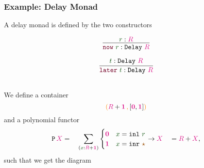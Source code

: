\documentclass[xelatex,mathserif,serif,notheorems]{beamer} %
\theoremstyle{plain} %
\theoremstyle{definition}
\theoremstyle{remark}
\newcommand*{\term}[1]{\textcolor{green!30!black}{#1}} %
\newcommand*{\type}[1]{\textcolor{magenta!90!black}{#1}}
\newcommand*{\containerpair}[2]{\ensuremath{\colorlet{savedleftcolor}{.}\color{orange}\left(\color{savedleftcolor}#1\,\textcolor{orange}{\mathbf{,}}\,#2\color{orange}\right)\color{savedleftcolor}}}
\newcommand*{\unit}{\type{\textbf{1}}}
\newcommand*{\empt}{\type{\textbf{0}}}
\newcommand*{\constant}[1]{\textcolor{orange!60!black}{\ensuremath{\mathtt{#1}}}}
\newcommand*{\function}[1]{\textcolor{blue!60!black}{\ensuremath{\mathtt{#1}}}}
\newcommand*{\constructor}[1]{\textcolor{purple!60!black}{\ensuremath{\mathtt{#1}}}}
\newcommand*{\typeformer}[1]{\ensuremath{\mathtt{#1}}}
\newcommand*{\functor}[1]{\ensuremath{\mathbf{\mathtt{#1}}}}
\newcommand*{\unitelem}{\constant{\star}} %
\begin{document}
\begin{frame}[fragile]
  \frametitle{Example: Delay Monad}
  A delay monad is defined by the two constructors\\
  \strut
  \hfill
  \begin{minipage}[h]{0.35\linewidth}
    \begin{equation}
      \vcenter{\infer{\constructor{now}~\term{r} : \typeformer{Delay}~\type{R}}{\term{r} : \type{R}}}
    \end{equation}
  \end{minipage}
  \hfill
  \begin{minipage}[h]{0.4\linewidth}
    \begin{equation}
      \vcenter{\infer{\constructor{later}~\term{t} : \typeformer{Delay}~\type{R}}{\term{t} : \typeformer{Delay}~\type{R}}}
    \end{equation}
  \end{minipage}
  \hfill
  \strut
  \\[2mm]
  We define a container
  \begin{equation}
    \containerpair{\type{R} + \unit}{[\empt, \unit]}
  \end{equation}
  and a polynomial functor
  \begin{equation}
    \functor{P}\,\type{X} = \quad \sum_{(\term{x} : \type{R} + \unit)} \begin{cases} \empt & \term{x} = \mathtt{inl}~\term{r} \\ \unit & \term{x} = \mathtt{inr}~\unitelem \end{cases} \rightarrow \type{X} \quad = \type{R} + \type{X},
  \end{equation}
  such that we get the diagram
  \begin{figure}[h]
    \centering
  \end{figure}
\end{frame}
\end{document}

